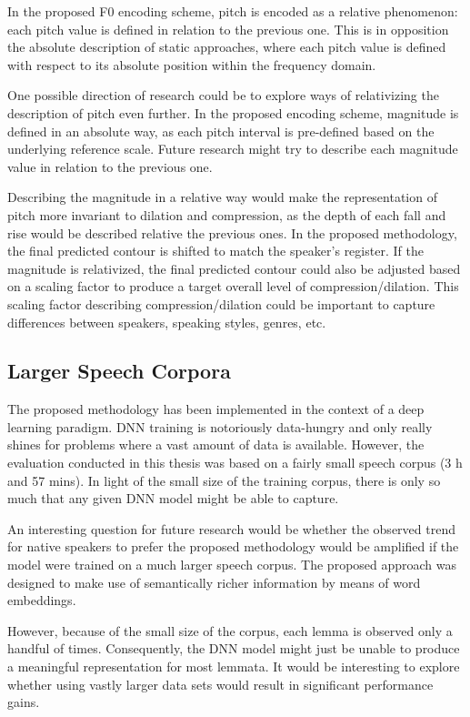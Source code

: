In the proposed \ac{F0} encoding scheme, pitch is encoded as a relative phenomenon: each pitch value is defined in relation to the previous one.
This is in opposition the absolute description of static approaches, where each pitch value is defined with respect to its absolute position within the frequency domain.

One possible direction of research could be to explore ways of relativizing the description of pitch even further.
In the proposed encoding scheme, magnitude is defined in an absolute way, as each pitch interval is pre-defined based on the underlying reference scale.
Future research might try to describe each magnitude value in relation to the previous one.

Describing the magnitude in a relative way would make the representation of pitch more invariant to dilation and compression, as the depth of each fall and rise would be described relative the previous ones.
In the proposed methodology, the final predicted contour is shifted to match the speaker's register.
If the magnitude is relativized, the final predicted contour could also be adjusted based on a scaling factor to produce a target overall level of compression/dilation.
This scaling factor describing compression/dilation could be important to capture differences between speakers, speaking styles, genres, etc.

\subsection{Larger Speech Corpora}

The proposed methodology has been implemented in the context of a deep learning paradigm.
\ac{DNN} training is notoriously data-hungry and only really shines for problems where a vast amount of data is available.
However, the evaluation conducted in this thesis was based on a fairly small speech corpus (3 h and 57 mins).
In light of the small size of the training corpus, there is only so much that any given \ac{DNN} model might be able to capture.

An interesting question for future research would be whether the observed trend for native speakers to prefer the proposed methodology would be amplified if the model were trained on a much larger speech corpus. 
The proposed approach was designed to make use of semantically richer information by means of word embeddings.

However, because of the small size of the corpus, each lemma is observed only a handful of times.
Consequently, the \ac{DNN} model might just be unable to produce a meaningful representation for most lemmata.
It would be interesting to explore whether using vastly larger data sets would result in significant performance gains.

